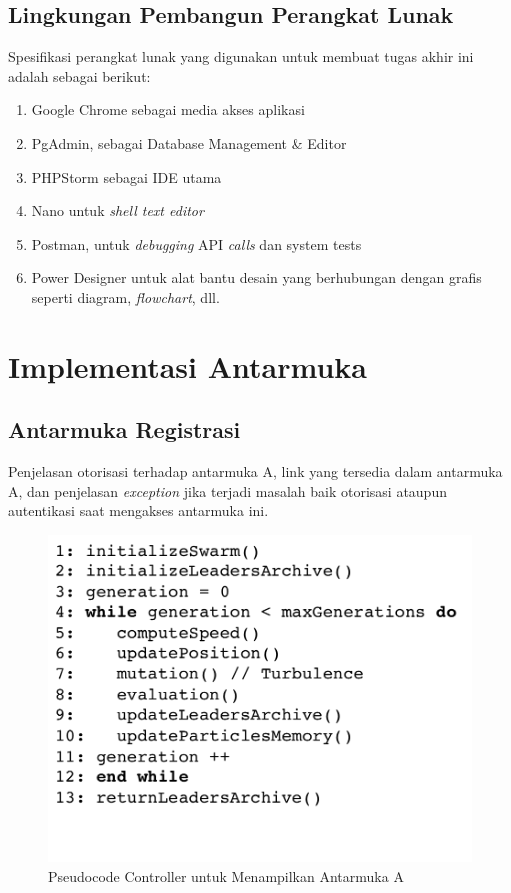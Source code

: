   \subsection{Lingkungan Pembangun Perangkat Lunak}
  Spesifikasi perangkat lunak yang digunakan untuk membuat tugas akhir ini adalah sebagai berikut:
	  \begin{enumerate}
	  \item Google Chrome sebagai media akses aplikasi
	  \item PgAdmin, sebagai Database Management \& Editor
	  \item PHPStorm sebagai IDE utama
	  \item Nano untuk \textit{shell text editor}
	  \item Postman, untuk \textit{debugging} API \textit{calls} dan system tests
	  \item Power Designer untuk alat bantu desain yang berhubungan dengan grafis seperti diagram, \textit{flowchart}, dll.
	  \end{enumerate}
  
\section{Implementasi Antarmuka}
	
    \subsection{Antarmuka Registrasi}
    
    Penjelasan otorisasi terhadap antarmuka A, link yang tersedia dalam antarmuka A, dan penjelasan \textit{exception} jika terjadi masalah baik otorisasi ataupun autentikasi saat mengakses antarmuka ini.
  
      \begin{figure}[H]
        \centering
        \includegraphics[width=\linewidth]{images/bab4/smpso_code.png}
        \caption{ Pseudocode Controller untuk Menampilkan Antarmuka A }
        \label{pdm}
      \end{figure}
      
